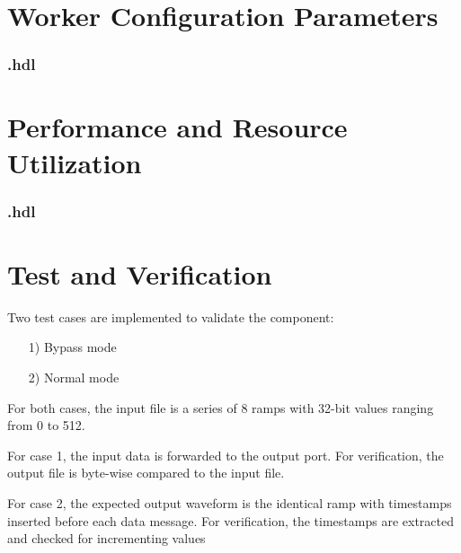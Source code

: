 \begin{landscape}
\section*{Worker Configuration Parameters}
\subsubsection*{\comp.hdl}
%
\section*{Performance and Resource Utilization}
\subsubsection*{\comp.hdl}
%
\end{landscape}
\section*{Test and Verification}
\begin{flushleft}
	Two test cases are implemented to validate the \Comp{} component:
	\begin{itemize}
		\item[1)] Bypass mode
		\item[2)] Normal mode
	\end{itemize}
	For both cases, the input file is a series of 8 ramps with 32-bit values ranging from 0 to 512.\par\medskip
	For case 1, the input data is forwarded to the output port. For verification, the output file is byte-wise compared to the input file.\par\medskip
	For case 2,  the expected output waveform is the identical ramp with timestamps inserted before each data message. For verification, the timestamps are extracted and checked for incrementing values
\end{flushleft}

